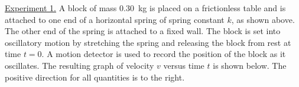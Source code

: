 \documentclass{../../oss-apphys-exam}
\begin{document}
\begin{questions}
  \newpage

  \question \underline{Experiment 1.} A block of mass \SI{.30}{\kilo\gram} is
  placed on a frictionless table and is attached to one end of a horizontal
  spring of spring constant $k$, as shown above. The other end of the spring is
  attached to a fixed wall. The block is set into oscillatory motion by
  stretching the spring and releasing the block from rest at time $t=0$. A
  motion detector is used to record the position of the block as it oscillates.
  The resulting graph of velocity $v$ versus time $t$ is shown below. The
  positive direction for all quantities is to the right.
\end{questions}
\end{document}
